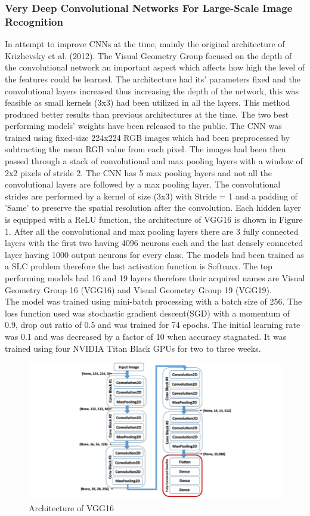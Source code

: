 \documentclass{csfyp}
\newcommand\tab[1][1cm]{\hspace*{#1}}
\begin{document}
\subsubsection{Very Deep Convolutional Networks For Large-Scale Image Recognition}
In attempt to improve CNNs at the time, mainly the original architecture of Krizhevsky et al. (2012). The Visual Geometry Group focused on the depth of the convolutional network an important aspect which affects how high the level of the features could be learned. The architecture had its’ parameters fixed and the convolutional layers increased thus increasing the depth of the network, this was feasible as small kernels (3x3) had been utilized in all the layers. This method produced better results than previous architectures at the time. The two best performing models’ weights have been released to the public. The CNN was trained using fixed-size 224x224 RGB images which had been preprocessed by subtracting the mean RGB value from each pixel. The images had been then passed through a stack of convolutional and max pooling layers with a window of 2x2 pixels of stride 2. The CNN has 5 max pooling layers and not all the convolutional layers are followed by a max pooling layer. The convolutional strides are performed by a kernel of size (3x3) with Stride = 1 and a padding of 'Same' to preserve the spatial resolution after the convolution. Each hidden layer is equipped with a ReLU function, the architecture of VGG16 is dhown in Figure 1. After all the convolutional and max pooling layers there are 3 fully connected layers with the first two having 4096 neurons each and the last densely connected layer having 1000 output neurons for every class. The models had been trained as a SLC problem therefore the last activation function is Softmax. The top performing models had 16 and 19 layers therefore their acquired names are Visual Geometry Group 16 (VGG16) and Visual Geometry Group 19 (VGG19).
\\
\tab
The model was trained using mini-batch processing with a batch size of 256. The loss function used was stochastic gradient descent(SGD) with a momentum of 0.9, drop out ratio of 0.5 and was trained for 74 epochs. The initial  learning rate was 0.1 and was decreased by a factor of 10 when accuracy stagnated. It was trained using four NVIDIA Titan Black GPUs for two to three weeks.
\\
\begin{figure}[!htbp]
\includegraphics[scale=0.50,center]{VGG16Blocks.pdf}
\caption{Architecture of VGG16}
\end{figure}
\end{document}

